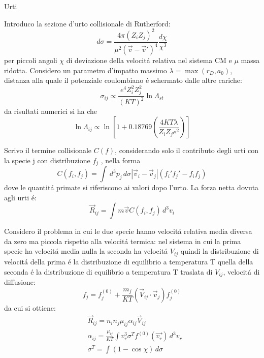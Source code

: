 \begin{frame}{Urti}

Introduco la sezione d'urto collisionale di Rutherford:
\begin{equation}
d\sigma=\frac{4\pi(Z_iZ_j)^2}{\mu^2(\vec{v}-\vec{v}')^4}\frac{d\chi}{\chi^3}
\end{equation}
per piccoli angoli $\chi$ di deviazione della velocit\'a relativa nel sistema CM  e $\mu$ massa ridotta. Considero un parametro d'impatto massimo $\lambda=\max{(r_D,a_0)}$, distanza alla quale il potenziale coulombiano \'e schermato dalle altre cariche:
\begin{equation}
\sigma_{ij}\propto \frac{e^4Z_i^2Z_j^2}{(KT)^2}\ln{\Lambda_{st}}
\end{equation}
da risultati numerici si ha che
\begin{equation}
\ln{\Lambda_{ij}}\propto\ln{[1+0.18769(\frac{4KT\lambda}{Z_iZ_je^2})]}
\end{equation}

Scrivo il termine collisionale $C(f)$, considerando solo il contributo degli urti con la specie j con distribuzione $f_j$ , nella forma
\begin{equation}
C(f_i,f_j)=\int\,d^3p_j\,d\sigma|\vec{v}_i-\vec{v}_j|(f_i'f_j'-f_if_j)
\end{equation}
dove le quantit\'a primate si riferiscono ai valori dopo l'urto. La forza netta dovuta agli urti \'e:
\begin{equation}
\vec{R}_{ij}=\int m\vec{v}C(f_i,f_j)\,d^3v_i\label{eq:friction}
\end{equation}

Considero il problema in cui le due specie hanno velocit\'a relativa media diversa da zero ma piccola rispetto alla velocit\'a termica: nel sistema in cui la prima specie ha velocit\'a media nulla la seconda ha velocit\'a $V_{ij}$ quindi la distribuzione di velocit\'a della prima \'e la distribuzione di equilibrio a temperatura T quella della seconda \'e  la distribuzione di equilibrio a temperatura T traslata di $V_{ij}$, velocit\'a di diffusione:
\begin{equation}
f_j=f_j^{(0)}+\frac{m_j}{KT}(\vec{V}_{ij}\cdot\vec{v}_j)f_j^{(0)}
\end{equation}
da cui si ottiene:
\begin{align}
&\vec{R}_{ij}=n_in_j\mu_{ij}\alpha_{ij}\vec{V}_{ij}\label{eq:resistance}\\
&\alpha_{ij}=\frac{\mu_{ij}}{KT}\int v_r^3\sigma^Tf^{(0)}(\vec{v_r})\,d^3v_r\label{eq:collisionintegral}\\ &\sigma^T=\int(1-\cos{\chi})\,d\sigma\label{eq:sigmatransport}
\end{align}


\end{frame}
